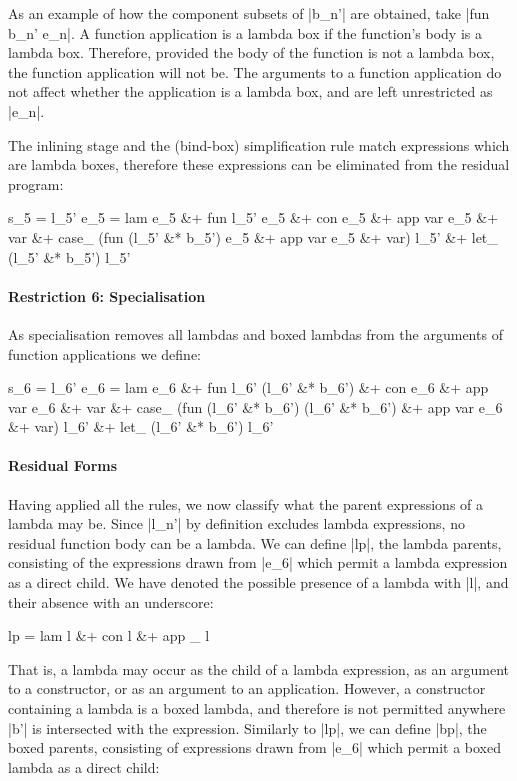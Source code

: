 As an example of how the component subsets of |b_n'| are obtained, take |fun b_n' e_n|. A function application is a lambda box if the function's body is a lambda box. Therefore, provided the body of the function is not a lambda box, the function application will not be. The arguments to a function application do not affect whether the application is a lambda box, and are left unrestricted as |e_n|.

The inlining stage and the (bind-box) simplification rule match expressions which are lambda boxes, therefore these expressions can be eliminated from the residual program:

\ignore\begin{code}
s_5   =  l_5'
e_5   =  lam e_5 &+ fun l_5' e_5 &+ con e_5 &+ app var e_5 &+ var &+
         case_ (fun (l_5' &* b_5') e_5 &+ app var e_5 &+ var) l_5' &+
         let_ (l_5' &* b_5') l_5'
\end{code}

\paragraph{Restriction 6: Specialisation}
As specialisation removes all lambdas and boxed lambdas from the arguments of function applications we define:

\ignore\begin{code}
s_6  =  l_6'
e_6  =  lam e_6 &+ fun l_6' (l_6' &* b_6') &+ con e_6 &+ app var e_6 &+ var &+
        case_ (fun (l_6' &* b_6') (l_6' &* b_6') &+ app var e_6 &+ var) l_6' &+
        let_ (l_6' &* b_6') l_6'
\end{code}

\paragraph{Residual Forms}
Having applied all the rules, we now classify what the parent expressions of a lambda may be. Since |l_n'| by definition excludes lambda expressions, no residual function body can be a lambda. We can define |lp|, the lambda parents, consisting of the expressions drawn from |e_6| which permit a lambda expression as a direct child. We have denoted the possible presence of a lambda with |l|, and their absence with an underscore:

\ignore\begin{code}
lp = lam l &+ con l &+ app _ l
\end{code}

That is, a lambda may occur as the child of a lambda expression, as an argument to a constructor, or as an argument to an application. However, a constructor containing a lambda is a boxed lambda, and therefore is not permitted anywhere |b'| is intersected with the expression. Similarly to |lp|, we can define |bp|, the boxed parents, consisting of expressions drawn from |e_6| which permit a boxed lambda as a direct child:

